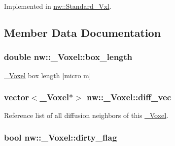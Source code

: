 Implemented in \hyperlink{classnw_1_1_standard___vxl_a1d8906f5bbbce6315585959bd1b1a935}{nw\+::\+Standard\+\_\+\+Vxl}.



\subsection{Member Data Documentation}
\hypertarget{classnw_1_1___voxel_ad9c3dbd0ea989af6ba7e1b5e09f6a989}{
\subsubsection[{box\+\_\+length}]{\setlength{\rightskip}{0pt plus 5cm}double nw\+::\+\_\+\+Voxel\+::box\+\_\+length\hspace{0.3cm}{\ttfamily [protected]}}}\label{classnw_1_1___voxel_ad9c3dbd0ea989af6ba7e1b5e09f6a989}


\hyperlink{classnw_1_1___voxel}{\+\_\+\+Voxel} box length \mbox{[}micro m\mbox{]} 

\hypertarget{classnw_1_1___voxel_abb780e4dc55e1cde47756aef6e2d746f}{
\subsubsection[{diff\+\_\+vec}]{\setlength{\rightskip}{0pt plus 5cm}vector$<${\bf \+\_\+\+Voxel}$\ast$$>$ nw\+::\+\_\+\+Voxel\+::diff\+\_\+vec\hspace{0.3cm}{\ttfamily [protected]}}}\label{classnw_1_1___voxel_abb780e4dc55e1cde47756aef6e2d746f}


Reference list of all diffusion neighbors of this \hyperlink{classnw_1_1___voxel}{\+\_\+\+Voxel}. 

\hypertarget{classnw_1_1___voxel_a9c331fe7c0fd8691ef0124f33809764f}{
\subsubsection[{dirty\+\_\+flag}]{\setlength{\rightskip}{0pt plus 5cm}bool nw\+::\+\_\+\+Voxel\+::dirty\+\_\+flag\hspace{0.3cm}{\ttfamily [protected]}}}\label{classnw_1_1___voxel_a9c331fe7c0fd8691ef0124f33809764f}


